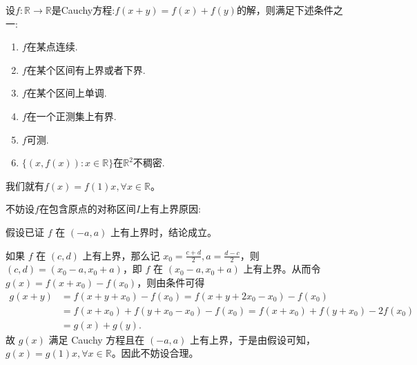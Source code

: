 \documentclass[lang=cn,newtx,10pt,scheme=chinese]{elegantbook}
\begin{document}
\begin{theorem}[Cauchy方程基本定理]\label{theorem:Cauchy方程基本定理}
设\(f:\mathbb{R}\to\mathbb{R}\)是Cauchy方程:$f(x + y)=f(x)+f(y)$的解，则满足下述条件之一:
\begin{enumerate}
\item \(f\)在某点连续.

\item  \(f\)在某个区间有上界或者下界.

\item  \(f\)在某个区间上单调.

\item  \(f\)在一个正测集上有界.

\item   \(f\)可测.

\item \(\{(x,f(x)):x\in\mathbb{R}\}\)在\(\mathbb{R}^2\)不稠密.
\end{enumerate}
我们就有\(f(x)=f(1)x,\forall x\in\mathbb{R}\)。
\end{theorem}
\begin{remark}
\hypertarget{不妨设的原因112}{不妨设\(f\)在包含原点的对称区间\(I\)上有上界原因:}假设已证 \(f\) 在 \((-a,a)\) 上有上界时，结论成立。

如果 \(f\) 在 \((c,d)\) 上有上界，那么记 \(x_0 = \frac{c + d}{2},a = \frac{d - c}{2}\)，则 \((c,d)=(x_0 - a,x_0 + a)\)，即
\(f\) 在 \((x_0 - a,x_0 + a)\) 上有上界。从而令 \(g(x)=f(x + x_0)-f(x_0)\)，则由条件可得
\begin{align*}
g(x + y)&=f(x + y + x_0)-f(x_0)
=f(x + y + 2x_0 - x_0)-f(x_0)\\
&=f(x + x_0)+f(y + x_0 - x_0)-f(x_0)
=f(x + x_0)+f(y + x_0)-2f(x_0)\\
&=g(x)+g(y).
\end{align*}
故 \(g(x)\) 满足 Cauchy 方程且在 \((-a,a)\) 上有上界，于是由假设可知，\(g(x)=g(1)x,\forall x\in \mathbb{R}\)。因此不妨设合理。
\end{remark}
\end{document}
